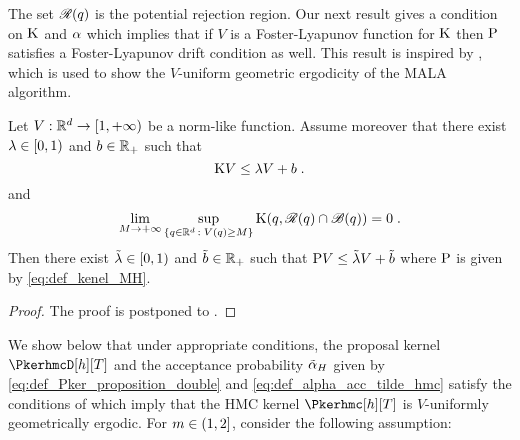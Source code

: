 The set $\mathscr{R}(q)$ is the potential rejection region.
Our next result gives a condition on $\mathrm{K}$ and $\alpha$ which
implies that if $V$ is a Foster-Lyapunov function for $\mathrm{K}$ then
$\mathrm{P}$ satisfies a Foster-Lyapunov drift condition as well. This
result is inspired by \cite[Theorem~4.1]{roberts:tweedie:1996}, which is used to show the $V$-uniform geometric ergodicity of the MALA algorithm.
\begin{proposition}
\label{propo:geo_drift_MH}
  Let $V : \mathbb{R}^d \to \left[1,+\infty\right)$ be a norm-like  function.
  Assume moreover that there exist  $\lambda \in \left[0,1\right)$ and $b \in \mathbb{R}_+$ such that
  \begin{equation}
  \label{eq:assum:geo_ergo_1}
  \mathrm{K} V \leq  \lambda V + b \;.
  \end{equation}
and
\begin{equation}
\label{eq:assum:geo_ergo_2}
  \lim_{M \to +\infty} \sup_{\left\{q \in \mathbb{R}^d\,:\; V(q) \geq M\right\}} \mathrm{K}(q,\mathscr{R}(q) \cap \mathscr{B}(q)) = 0  \;.
\end{equation}
 Then there exist  $\tilde{\lambda} \in \left[0,1\right)$ and $\tilde{b} \in \mathbb{R}_+$ such that
 $\mathrm{P} V \leq  \tilde{\lambda} V + \tilde{b}$ where $\mathrm{P}$ is given by \eqref{eq:def_kenel_MH}.
\end{proposition}
\begin{proof}
The proof is postponed to .
\end{proof}
We show below that under appropriate conditions, the proposal kernel $\PkerhmcD[h][T]$ and
the acceptance probability $\tilde{\alpha}_{H}$ given by \eqref{eq:def_Pker_proposition_double} and
\eqref{eq:def_alpha_acc_tilde_hmc} satisfy the conditions of
 which imply that the HMC kernel
$\Pkerhmc[h][T]$ is $V$-uniformly geometrically ergodic. %
For $m \in \left(1,2\right]$, consider the following assumption:



